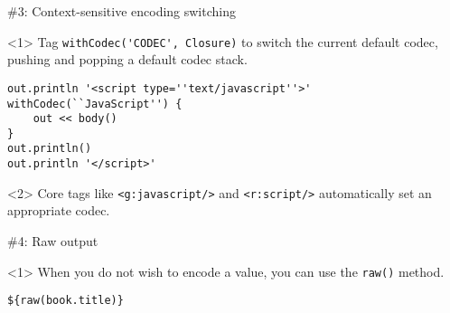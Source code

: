 {\begin{frame}
\end{frame}



\begin{frame}

    \begin{center}
      \Huge\color{green} \#3: Context-sensitive encoding switching
    \end{center}

    \vspace{1cm}

    \begin{onlyenv}<1>
      Tag \verb|withCodec('CODEC', Closure)| to switch the current default codec, pushing and popping a default codec stack.
      \begin{center}
        \begin{minipage}{\textwidth}
          \begin{verbatim}
out.println '<script type=''text/javascript''>'
withCodec(``JavaScript'') {
    out << body()
}
out.println()
out.println '</script>'
          \end{verbatim}
        \end{minipage}
      \end{center}
    \end{onlyenv}

    \begin{onlyenv}<2>
      Core tags like \verb|<g:javascript/>| and \verb|<r:script/>| automatically set an appropriate codec.
    \end{onlyenv}

\end{frame}



\begin{frame}

    \begin{center}
      \Huge\color{green} \#4: Raw output
    \end{center}

    \vspace{1cm}

    \begin{onlyenv}<1>
      When you do not wish to encode a value, you can use the \verb|raw()| method.
      \begin{center}
        \begin{minipage}{\textwidth}
          \begin{verbatim}
${raw(book.title)}
          \end{verbatim}
        \end{minipage}
      \end{center}


\end{onlyenv}
\end{frame}}
